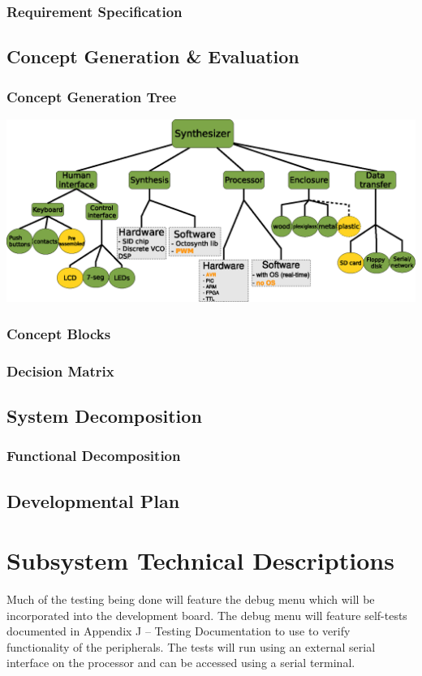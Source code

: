 \documentclass[abstract=on,paper=a4, fontsize=12pt]{scrartcl}		%
\begin{document}
    \subsubsection{Requirement Specification}
  \subsection{Concept Generation \& Evaluation}  
    \subsubsection{Concept Generation Tree}
      \includegraphics[width=\textwidth]{img/fig_concepttree}
    \subsubsection{Concept Blocks}
    \subsubsection{Decision Matrix}
  \subsection{System Decomposition}
    \subsubsection{Functional Decomposition}
  \subsection{Developmental Plan}
\section{Subsystem Technical Descriptions}
  Much of the testing being done will feature the debug menu which will be incorporated into the development board. The debug menu will feature self-tests documented in  Appendix J – Testing Documentation to use to verify functionality of the peripherals. The tests will run using an external serial interface on the processor and can be accessed using a serial terminal.\par
\end{document}

